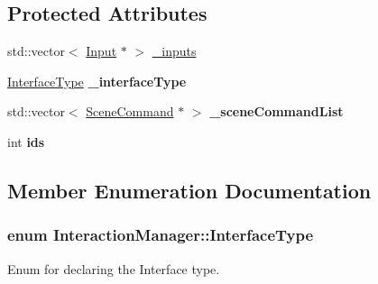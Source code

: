 \subsection*{Protected Attributes}
\begin{DoxyCompactItemize}
\item 
std::vector$<$ \hyperlink{class_input}{Input} $\ast$ $>$ \hyperlink{class_interaction_manager_ac53841738a009ffa19f735afe32ccec0}{\_\-inputs}
\item 
\hypertarget{class_interaction_manager_a9176c360d83f96ee0c64cc46bfe1bad4}{
\hyperlink{class_interaction_manager_a8d6641e1266e7178e41427d3c266ec0a}{InterfaceType} {\bfseries \_\-interfaceType}}
\label{class_interaction_manager_a9176c360d83f96ee0c64cc46bfe1bad4}

\item 
\hypertarget{class_interaction_manager_acfbb8fe91da55cb0669b67891dbaeba0}{
std::vector$<$ \hyperlink{class_scene_command}{SceneCommand} $\ast$ $>$ {\bfseries \_\-sceneCommandList}}
\label{class_interaction_manager_acfbb8fe91da55cb0669b67891dbaeba0}

\item 
\hypertarget{class_interaction_manager_a1618f3e6da71b728dd12a6dffc0c895b}{
int {\bfseries ids}}
\label{class_interaction_manager_a1618f3e6da71b728dd12a6dffc0c895b}

\end{DoxyCompactItemize}


\subsection{Member Enumeration Documentation}
\hypertarget{class_interaction_manager_a8d6641e1266e7178e41427d3c266ec0a}{
\subsubsection[{InterfaceType}]{\setlength{\rightskip}{0pt plus 5cm}enum {\bf InteractionManager::InterfaceType}}}
\label{class_interaction_manager_a8d6641e1266e7178e41427d3c266ec0a}
Enum for declaring the Interface type. 

